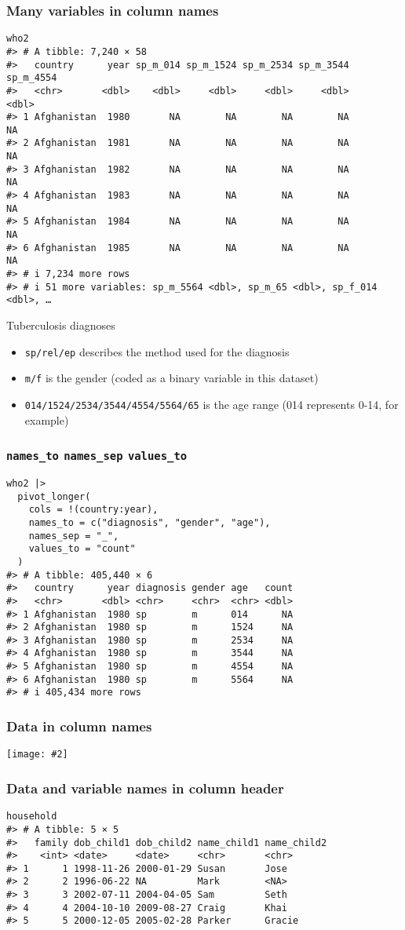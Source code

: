 \documentclass{beamer}
\newcommand{\bi}{\begin{itemize}}
\newcommand{\li}{\item}
\newcommand{\ei}{\end{itemize}}
\newcommand{\fig}[2]{\centerline{\texttt{[image: \#2]}}}
\newcommand{\bfr}[1]{\begin{frame}[fragile]\frametitle{{ #1 }}}
\begin{document}
\bfr{Many variables in column names}\scriptsize
\begin{verbatim}
who2
#> # A tibble: 7,240 × 58
#>   country      year sp_m_014 sp_m_1524 sp_m_2534 sp_m_3544 sp_m_4554
#>   <chr>       <dbl>    <dbl>     <dbl>     <dbl>     <dbl>     <dbl>
#> 1 Afghanistan  1980       NA        NA        NA        NA        NA
#> 2 Afghanistan  1981       NA        NA        NA        NA        NA
#> 3 Afghanistan  1982       NA        NA        NA        NA        NA
#> 4 Afghanistan  1983       NA        NA        NA        NA        NA
#> 5 Afghanistan  1984       NA        NA        NA        NA        NA
#> 6 Afghanistan  1985       NA        NA        NA        NA        NA
#> # i 7,234 more rows
#> # i 51 more variables: sp_m_5564 <dbl>, sp_m_65 <dbl>, sp_f_014 <dbl>, …
\end{verbatim}
\centerline{Tuberculosis diagnoses}
\vfill
\bi
\li {\tt sp/rel/ep}  describes the method used for the diagnosis
\li {\tt m/f} is the gender (coded as a binary variable in this dataset)
\li {\tt 014/1524/2534/3544/4554/5564/65} is the age range (014 represents 0-14, for example)
\ei
\end{frame}

\bfr{{\tt names\_to} {\tt names\_sep} {\tt values\_to}}\scriptsize
\begin{verbatim}
who2 |> 
  pivot_longer(
    cols = !(country:year),
    names_to = c("diagnosis", "gender", "age"), 
    names_sep = "_",
    values_to = "count"
  )
#> # A tibble: 405,440 × 6
#>   country      year diagnosis gender age   count
#>   <chr>       <dbl> <chr>     <chr>  <chr> <dbl>
#> 1 Afghanistan  1980 sp        m      014      NA
#> 2 Afghanistan  1980 sp        m      1524     NA
#> 3 Afghanistan  1980 sp        m      2534     NA
#> 4 Afghanistan  1980 sp        m      3544     NA
#> 5 Afghanistan  1980 sp        m      4554     NA
#> 6 Afghanistan  1980 sp        m      5564     NA
#> # i 405,434 more rows
\end{verbatim}
\end{frame}

\bfr{Data in column names}
\fig{1}{multiple-names.png}
\end{frame}


\bfr{Data and variable names in column header}\scriptsize
\begin{verbatim}
household
#> # A tibble: 5 × 5
#>   family dob_child1 dob_child2 name_child1 name_child2
#>    <int> <date>     <date>     <chr>       <chr>      
#> 1      1 1998-11-26 2000-01-29 Susan       Jose       
#> 2      2 1996-06-22 NA         Mark        <NA>       
#> 3      3 2002-07-11 2004-04-05 Sam         Seth       
#> 4      4 2004-10-10 2009-08-27 Craig       Khai       
#> 5      5 2000-12-05 2005-02-28 Parker      Gracie
\end{verbatim}
\end{frame}
\end{document}
